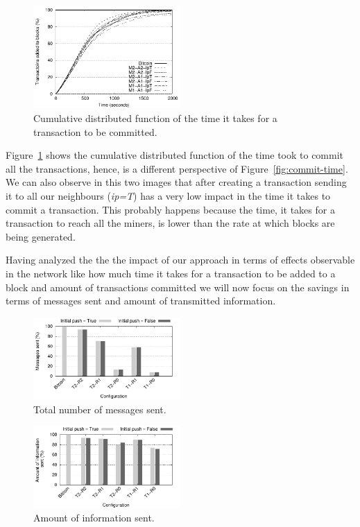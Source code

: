 \documentclass{dads}   %
\begin{document}
\begin{figure}
\centering
\includegraphics[width=0.5\textwidth]{plots/cdf_commit.pdf}
\caption{Cumulative distributed function of the time it takes for a transaction to be committed.}
\label{fig:cdf-commit}
\end{figure}

Figure~\ref{fig:cdf-commit} shows the cumulative distributed function of the time took to commit all the transactions, hence, is a different perspective of Figure~\ref{fig:commit-time}. We can also observe in this two images that after creating a transaction sending it to all our neighbours  (\emph{ip=T}) has a very low impact in the time it takes to commit a transaction. This probably happens because the time, it takes for a transaction to reach all the miners, is lower than the rate at which blocks are being generated.

Having analyzed the the the impact of our approach in terms of effects observable in the network like how much time it takes for a transaction to be added to a block and amount of transactions committed we will now focus on the savings in terms of messages sent and amount of transmitted information.

\begin{figure}
\centering
\includegraphics[width=0.5\textwidth]{plots/msg-sent.pdf}
\caption{Total number of messages sent.}
\label{fig:msg-sent}
\end{figure}

\begin{figure}
\centering
\includegraphics[width=0.5\textwidth]{plots/mb-sent.pdf}
\caption{Amount of information sent.}
\label{fig:mb-sent}
\end{figure}
\end{document}
